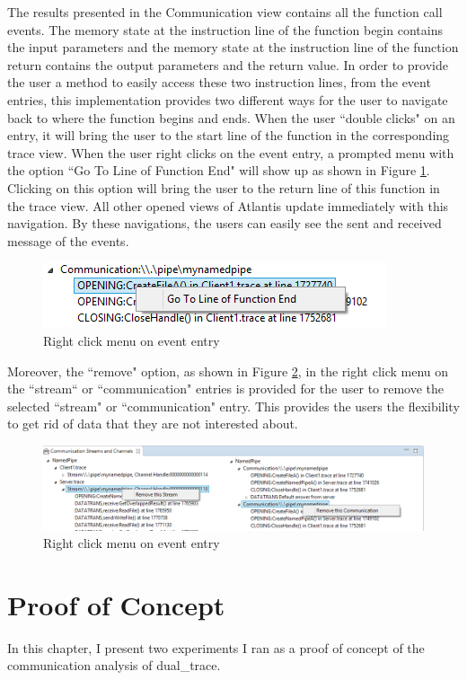 \documentclass[12pt,oneside]{book}
\newcommand\startchapter[1]{\chapter{#1}\thispagestyle{myheadings}}
\begin{document}
The results presented in the Communication view contains all the function call events. The memory state at the instruction line of the function begin contains the input parameters and the memory state at the instruction line of the function return contains the output parameters and the return value. In order to provide the user a method to easily access these two instruction lines, from the event entries, this implementation provides two different ways for the user to navigate back to where the function begins and ends. When the user ``double clicks" on an entry, it will bring the user to the start line of the function in the corresponding trace view. When the user right clicks on the event entry, a prompted menu with the option ``Go To Line of Function End" will show up as shown in Figure \ref{gotoend}. Clicking on this option will bring the user to the return line of this function in the trace view. All other opened views of Atlantis update immediately with this navigation. By these navigations, the users can easily see the sent and received message of the events.

\begin{figure}[H]
\centerline{\includegraphics{Figures/gotoend}}
 \caption{Right click menu on event entry}
\label{gotoend}
\end{figure}

Moreover, the ``remove" option, as shown in Figure \ref{remove}, in the right click menu on the ``stream“ or ``communication" entries is provided for the user to remove the selected ``stream" or ``communication" entry. This provides the users the flexibility to get rid of data that they are not interested about.

\begin{figure}[H]
\centerline{\includegraphics[scale=0.7]{Figures/remove}}
 \caption{Right click menu on event entry}
\label{remove}
\end{figure}


	


\startchapter{Proof of Concept}
\label{chapter:Exp}
In this chapter, I present two experiments I ran as a proof of concept of the communication analysis of dual\_trace.
\end{document}
